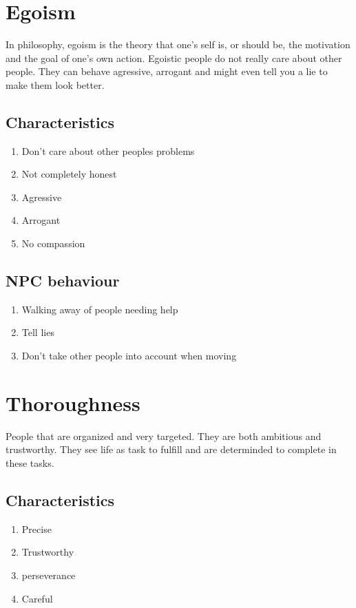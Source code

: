 \documentclass{article}
\begin{document}
\section{Egoism}
In philosophy, egoism is the theory that one’s self is, or should be, the motivation and the goal of one’s own action. \cite{egoism}
Egoistic people do not really care about other people. They can behave agressive, arrogant and might even tell you a lie 
to make them look better. \cite{bigfive}

\subsection{Characteristics}
\begin{enumerate}
\item Don't care about other peoples problems
\item Not completely honest 
\item Agressive 
\item Arrogant 
\item No compassion
\end{enumerate} 

\subsection{NPC behaviour}
\begin{enumerate}
\item Walking away of people needing help
\item Tell lies
\item Don't take other people into account when moving 
\end{enumerate}

\section{Thoroughness}
People that are organized and very targeted. They are both ambitious and trustworthy.
They see life as task to fulfill and are determinded to complete in these tasks. \cite{bigfive}

\subsection{Characteristics}
\begin{enumerate}
\item Precise
\item Trustworthy 
\item perseverance 
\item Careful
\end{enumerate} 
\end{document}
